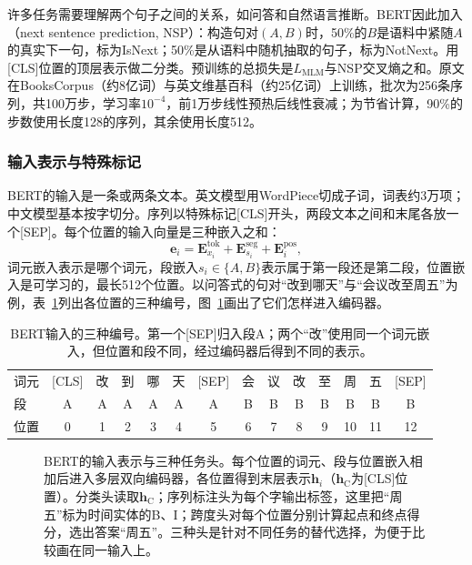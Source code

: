 许多任务需要理解两个句子之间的关系，如问答和自然语言推断。BERT因此加入（next sentence prediction, NSP）：构造句对$(A,B)$时，50\%的$B$是语料中紧随$A$的真实下一句，标为IsNext；50\%是从语料中随机抽取的句子，标为NotNext。用[CLS]位置的顶层表示做二分类。预训练的总损失是$L_{\mathrm{MLM}}$与NSP交叉熵之和。原文在BooksCorpus（约8亿词）与英文维基百科（约25亿词）上训练，批次为256条序列，共100万步，学习率$10^{-4}$，前1万步线性预热后线性衰减；为节省计算，90\%的步数使用长度128的序列，其余使用长度512。

\subsubsection{输入表示与特殊标记}
\label{sec:nlp-classical-bert-input}

BERT的输入是一条或两条文本。英文模型用WordPiece切成子词，词表约3万项；中文模型基本按字切分。序列以特殊标记[CLS]开头，两段文本之间和末尾各放一个[SEP]。每个位置的输入向量是三种嵌入之和：
\[
  \bm e_i=\bm E^{\mathrm{tok}}_{x_i}+\bm E^{\mathrm{seg}}_{s_i}+\bm E^{\mathrm{pos}}_{i},
\]
词元嵌入表示是哪个词元，段嵌入$s_i\in\{A,B\}$表示属于第一段还是第二段，位置嵌入是可学习的，最长512个位置。以问答式的句对“改到哪天”与“会议改至周五”为例，表~\ref{tab:nlp-classical-bert-input}列出各位置的三种编号，图~\ref{fig:nlp-classical-bert}画出了它们怎样进入编码器。

\begin{table}[htbp]
  \centering
  \setlength{\tabcolsep}{2.4pt}
  \begin{tabular}{@{}lccccccccccccc@{}}
    \toprule
    词元 & [CLS] & 改 & 到 & 哪 & 天 & [SEP] & 会 & 议 & 改 & 至 & 周 & 五 & [SEP]\\
    段 & A & A & A & A & A & A & B & B & B & B & B & B & B\\
    位置 & 0 & 1 & 2 & 3 & 4 & 5 & 6 & 7 & 8 & 9 & 10 & 11 & 12\\
    \bottomrule
  \end{tabular}
  \caption{BERT输入的三种编号。第一个[SEP]归入段A；两个“改”使用同一个词元嵌入，但位置和段不同，经过编码器后得到不同的表示。}
  \label{tab:nlp-classical-bert-input}
\end{table}

\begin{figure}[htbp]
  \centering
  
  \caption{BERT的输入表示与三种任务头。每个位置的词元、段与位置嵌入相加后进入多层双向编码器，各位置得到末层表示$\bm h_i$（$\bm h_{\mathrm C}$为[CLS]位置）。分类头读取$\bm h_{\mathrm C}$；序列标注头为每个字输出标签，这里把“周五”标为时间实体的B、I；跨度头对每个位置分别计算起点和终点得分，选出答案“周五”。三种头是针对不同任务的替代选择，为便于比较画在同一输入上。}
  \label{fig:nlp-classical-bert}
\end{figure}

